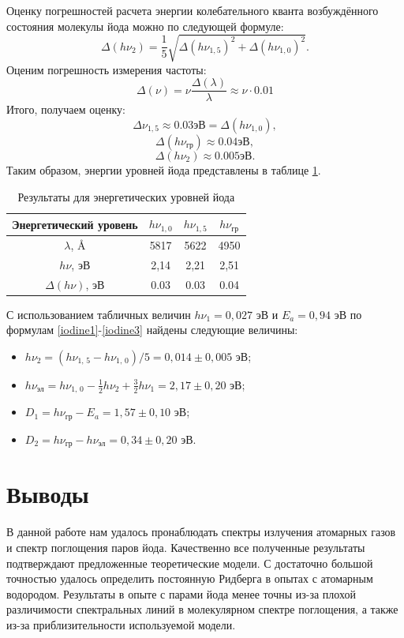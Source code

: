 Оценку погрешностей расчета энергии колебательного кванта возбуждённого состояния молекулы йода можно по следующей формуле:
$$\Delta (h\nu_2) = \frac{1}{5} \sqrt{\Delta (h\nu_{1,5})^2 + \Delta (h\nu_{1,0})^2}.$$
Оценим погрешность измерения частоты:
$$\Delta(\nu) = \nu \frac{\Delta(\lambda)}{\lambda} \approx \nu \cdot 0.01$$
Итого, получаем оценку:
$$\Delta{\nu_{1,5}} \approx 0.03 \text{эВ} = \Delta (h\nu_{1,0}),$$
$$\Delta (h\nu_{\text{гр}}) \approx 0.04 \text{эВ},$$
$$\Delta (h\nu_2) \approx 0.005 \text{эВ}.$$
Таким образом, энергии уровней йода представлены в таблице \ref{tab:iodine1}.
\begin{table}[h]
    \label{tab:iodine1}
    \centering
    \begin{tabular}{|c|c|c|c|} \hline
        Энергетический уровень & $h\nu_{1,0}$ & $h\nu_{1,5}$ & $h\nu_\text{гр}$ \\ \hline
        $\lambda$, \r{A} & 5817 & 5622 & 4950 \\ \hline
        $h\nu$, эВ & 2,14 & 2,21 & 2,51 \\ \hline
        $\Delta (h\nu)$, эВ & 0.03 & 0.03 & 0.04 \\ \hline
    \end{tabular}
    \caption{Результаты для энергетических уровней йода}
\end{table}

С использованием табличных величин $h\nu_1 = 0,027$ эВ и $E_a = 0,94$ эВ по формулам \eqref{iodine1}-\eqref{iodine3} найдены следующие величины:
\begin{itemize}
    \item $h\nu_2 = (h\nu_{1,\,5} - h\nu_{1,\,0})/5 = 0,014\pm0,005$ эВ;
    \item $h\nu_\text{эл} = h\nu_{1,\,0} - \frac{1}{2}h\nu_2 + \frac{3}{2}h\nu_1 = 2,17\pm0,20$ эВ;
    \item $D_1 = h\nu_\text{гр} - E_a = 1,57\pm0,10$ эВ;
    \item $D_2 = h\nu_\text{гр} - h\nu_\text{эл} = 0,34\pm0,20$ эВ.
\end{itemize}

\section{Выводы}
В данной работе нам удалось пронаблюдать спектры излучения атомарных газов и спектр поглощения паров йода. Качественно все полученные результаты подтверждают предложенные теоретические модели. С достаточно большой точностью удалось определить постоянную Ридберга в опытах с атомарным водородом. Результаты в опыте с парами йода менее точны из-за плохой различимости спектральных линий в молекулярном спектре поглощения, а также из-за приблизительности используемой модели.
